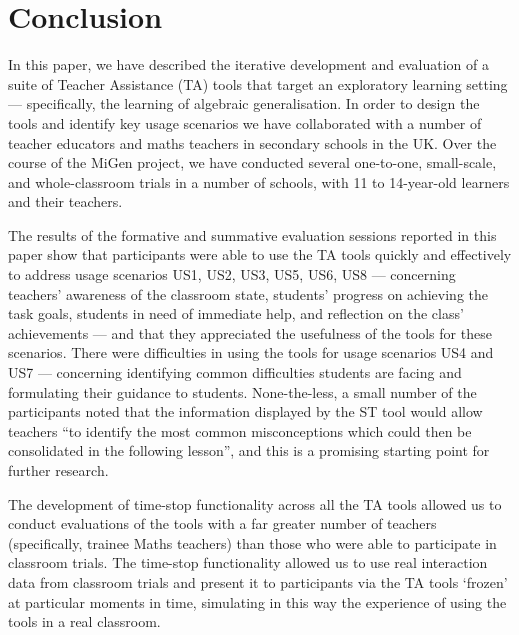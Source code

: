 \section{Conclusion}
\label{sec:conclusion}

In this paper, we have described the iterative development and evaluation of a suite
of Teacher Assistance (TA) tools that target an exploratory learning setting ---
specifically, the learning of algebraic generalisation.
In order to design the tools and identify key usage scenarios 
we have collaborated with a number of teacher educators and 
maths teachers in secondary schools in the UK. 
Over the course of the MiGen project, we have conducted several one-to-one, 
small-scale, and whole-classroom trials in a number of 
schools, with 11 to 14-year-old learners and their teachers. 

The results of the formative and summative evaluation sessions reported
in this paper show that participants were able to use the TA tools quickly and 
effectively to address usage scenarios US1, US2, US3, US5, US6, US8 ---
concerning teachers' awareness of the classroom state, students' progress 
on achieving the task goals, students in need of immediate help,
and reflection on the class' achievements ---
and that they appreciated the usefulness of the tools for these scenarios. 
There were difficulties in using the tools for usage scenarios US4 and US7 ---
concerning identifying common difficulties
students are facing and formulating their guidance to students. 
None-the-less, a small number of the participants noted 
that the information displayed by the ST tool would 
allow teachers ``to identify the most common misconceptions which could then be
consolidated in the following lesson'', and this is a promising
starting point for further research. 

The development of time-stop functionality across all the TA tools 
allowed us to conduct evaluations of the tools with a far greater
number of teachers (specifically, trainee Maths teachers) 
than those who were able to participate in classroom trials. 
The time-stop functionality allowed us to use real interaction data 
from classroom trials and present it to participants
via the TA tools `frozen' at particular moments in time,  
simulating in this way the experience of using the tools in a real classroom. 

